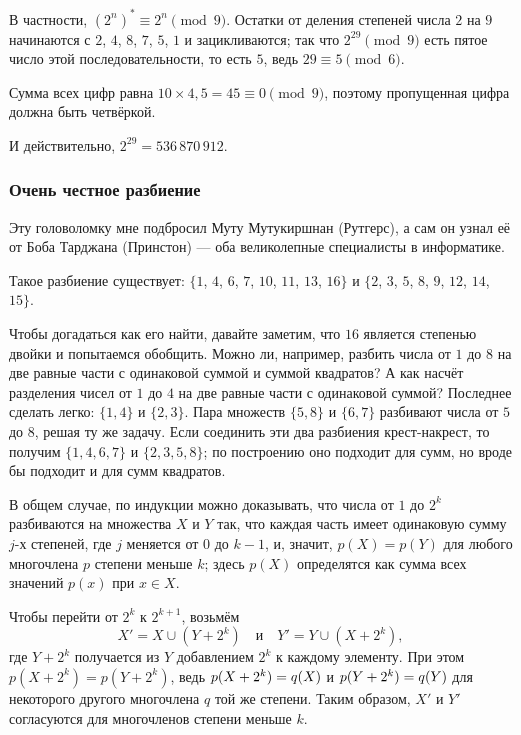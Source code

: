 В частности, $(2^n)^* \equiv 2^n \pmod 9$.
Остатки от деления степеней числа $2$ на $9$ начинаются с $2$, $4$, $8$, $7$, $5$, $1$ и зацикливаются;
так что $2^{29} \pmod 9$ есть пятое число этой последовательности, то есть $5$, ведь $29 \equiv 5 \pmod 6$.

Сумма всех цифр равна $10 \times 4{,}5 = 45 \equiv 0 \pmod 9$, поэтому пропущенная цифра должна быть четвёркой.

И действительно, $2^{29} = 536\,870\,912$.

\subsubsection*{Очень честное разбиение}

Эту головоломку мне подбросил Муту Мутукиршнан (Рутгерс),
а сам он узнал её от Боба Тарджана (Принстон) — 
оба великолепные специалисты в информатике.

Такое разбиение существует: $\{1$, $4$, $6$, $7$, $10$, $11$, $13$, $16\}$ и $\{2$, $3$, $5$, $8$, $9$, $12$, $14$, $15\}$.

Чтобы догадаться как его найти, давайте заметим, что $16$ является степенью двойки и попытаемся обобщить.
Можно ли, например, разбить числа от $1$ до $8$ на две равные части с одинаковой суммой и суммой квадратов?
А как насчёт разделения чисел от $1$ до $4$ на две равные части с одинаковой суммой?
Последнее сделать легко: $\{1, 4\}$ и $\{2, 3\}$.
Пара множеств $\{5, 8\}$ и $\{6, 7\}$ разбивают числа от $5$ до $8$, решая ту же задачу.
Если соединить эти два разбиения крест-накрест, то получим $\{1, 4, 6, 7\}$ и $\{2, 3, 5, 8\}$; по построению оно подходит для сумм, но вроде бы подходит и для сумм квадратов.

В общем случае, по индукции можно доказывать, что числа от $1$ до $2^k$ разбиваются на множества $X$ и $Y$ так, что каждая часть имеет одинаковую сумму $j$-х степеней, где $j$ меняется от $0$ до $k - 1$, и, значит, $p(X)=p(Y)$ для любого многочлена $p$ степени меньше $k$;
здесь $p(X)$ определятся как сумма всех значений $p(x)$ при $x \in X$.

Чтобы перейти от $2^{k}$ к $2^{k+1}$, возьмём 
\[X' = X \cup (Y + 2^k)\quad\text{и}\quad Y' = Y \cup (X + 2^k),\]
где $Y + 2^k$ получается из $Y$ добавлением $2^k$ к каждому элементу.
При этом $p(X + 2^k) = p(Y + 2^k)$,
ведь $p(X + 2^k)\z=q(X)$ и $p(Y + 2^k)\z=q(Y)$ для некоторого другого многочлена $q$ той же степени.
Таким образом, $X'$ и $Y'$ согласуются для многочленов степени меньше $k$. 

